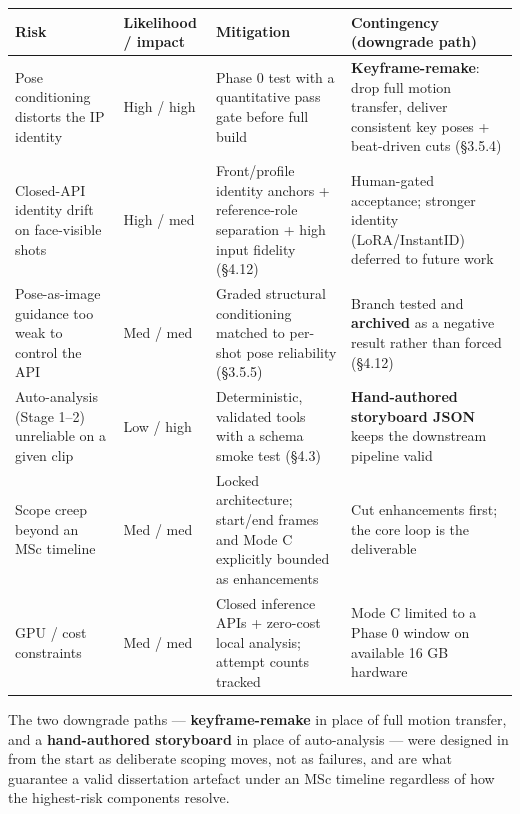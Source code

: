 \documentclass[10pt,twocolumn,letterpaper]{article}
\begin{document}
\begin{table}[t]
\centering
\footnotesize
\begin{tabularx}{\textwidth}{>{\RaggedRight\arraybackslash}X>{\RaggedRight\arraybackslash}X>{\RaggedRight\arraybackslash}X>{\RaggedRight\arraybackslash}X}
\toprule
Risk & Likelihood / impact & Mitigation & Contingency (downgrade path) \\
\midrule
Pose conditioning distorts the IP identity & High / high & Phase 0 test with a quantitative pass gate before full build & \textbf{Keyframe-remake}: drop full motion transfer, deliver consistent key poses + beat-driven cuts (\S{}3.5.4) \\
Closed-API identity drift on face-visible shots & High / med & Front/profile identity anchors + reference-role separation + high input fidelity (\S{}4.12) & Human-gated acceptance; stronger identity (LoRA/InstantID) deferred to future work \\
Pose-as-image guidance too weak to control the API & Med / med & Graded structural conditioning matched to per-shot pose reliability (\S{}3.5.5) & Branch tested and \textbf{archived} as a negative result rather than forced (\S{}4.12) \\
Auto-analysis (Stage 1--2) unreliable on a given clip & Low / high & Deterministic, validated tools with a schema smoke test (\S{}4.3) & \textbf{Hand-authored storyboard JSON} keeps the downstream pipeline valid \\
Scope creep beyond an MSc timeline & Med / med & Locked architecture; start/end frames and Mode C explicitly bounded as enhancements & Cut enhancements first; the core loop is the deliverable \\
GPU / cost constraints & Med / med & Closed inference APIs + zero-cost local analysis; attempt counts tracked & Mode C limited to a Phase 0 window on available 16 GB hardware \\
\bottomrule
\end{tabularx}
\end{table}

The two downgrade paths --- \textbf{keyframe-remake} in place of full motion transfer, and a \textbf{hand-authored storyboard} in place of auto-analysis --- were designed in from the start as deliberate scoping moves, not as failures, and are what guarantee a valid dissertation artefact under an MSc timeline regardless of how the highest-risk components resolve.

\par\vspace{22pt}
\end{document}
